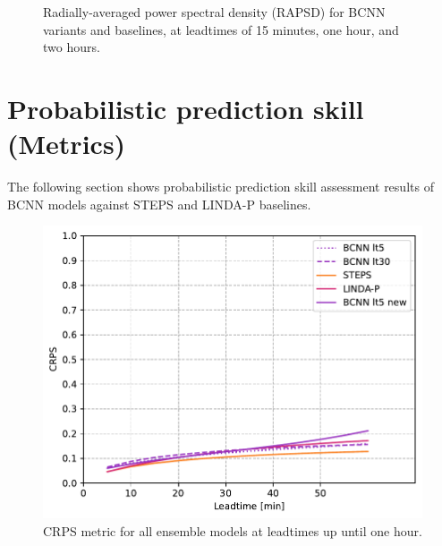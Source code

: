 \begin{figure}[H]
	\centering
	\caption{Radially-averaged power spectral density (RAPSD) for BCNN variants and baselines, at leadtimes of 15 minutes, one hour, and two hours.}
	\label{fig:rapsd}
\end{figure}

\section{Probabilistic prediction skill (Metrics)}

The following section shows probabilistic prediction skill assessment results of BCNN models against STEPS and LINDA-P baselines.

\begin{figure}[H]
	\centering
	\includegraphics[width=0.6\linewidth]{images/metrics/ALL_CRPS}
	\caption{CRPS metric for all ensemble models at leadtimes up until one hour.}
	\label{fig:crps}
\end{figure}

